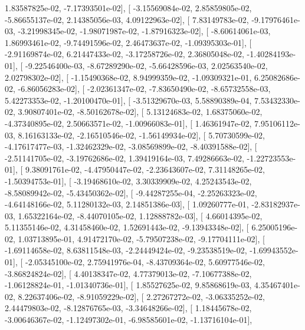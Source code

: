 \documentclass{article}
\begin{document}
          1.83587825e-02,  -7.17393501e-02],
       [ -3.15569084e-02,   2.85859805e-02,  -5.86655137e-02,
          2.14385056e-03,   4.09122963e-02],
       [  7.83149783e-02,  -9.17976461e-03,  -3.21998345e-02,
         -1.98071987e-02,  -1.87916323e-02],
       [ -8.60614061e-03,   1.86993461e-02,  -9.74491596e-02,
          2.46473637e-02,  -1.09395303e-01],
       [ -2.91169874e-02,   6.21447433e-02,  -3.17258726e-02,
          2.36805048e-02,  -1.40284193e-01],
       [ -9.22546400e-03,  -8.67289290e-02,  -5.66428596e-03,
          2.02563540e-02,   2.02798302e-02],
       [ -1.15490368e-02,   8.94999359e-02,  -1.09309321e-01,
          6.25082686e-02,  -6.86056283e-02],
       [ -2.02361347e-02,  -7.83650490e-02,  -8.65732558e-03,
          5.42273353e-02,  -1.20100470e-01],
       [ -3.51329670e-03,   5.58890389e-04,   7.53432330e-02,
          3.90807401e-02,  -8.50162678e-02],
       [  5.13124683e-02,   1.68375060e-02,  -4.37340895e-02,
          2.50663571e-02,  -1.00966083e-01],
       [  1.46361947e-02,   7.95106112e-03,   8.16163133e-02,
         -2.16510546e-02,  -1.56149934e-02],
       [  5.70730599e-02,  -4.17617477e-03,  -1.32462329e-02,
         -3.08569899e-02,  -8.40391588e-02],
       [ -2.51141705e-02,  -3.19762686e-02,   1.39419164e-03,
          7.49286663e-02,  -1.22723553e-01],
       [  9.38091761e-02,  -4.47950447e-02,  -2.23643607e-02,
          7.31148265e-02,  -1.50394753e-01],
       [ -3.19468610e-02,   3.30339909e-02,   4.25243543e-02,
         -8.58089942e-02,  -5.43450362e-02],
       [ -9.44287255e-04,  -2.25263323e-02,  -4.64148166e-02,
          5.11280132e-03,   2.14851386e-03],
       [  1.09260777e-01,  -2.83182937e-03,   1.65322164e-02,
         -8.44070105e-02,   1.12888782e-03],
       [  4.66014395e-02,   5.11355146e-02,   4.31458460e-02,
          1.52691443e-02,  -9.13943348e-02],
       [  6.25005196e-02,   1.03713895e-01,   4.91472170e-02,
         -5.79507238e-02,  -9.17704111e-02],
       [ -1.69114658e-02,   8.63811548e-03,  -2.24449424e-02,
         -9.23538519e-02,  -1.69943552e-01],
       [ -2.05345100e-02,   2.75941976e-04,  -8.43709364e-02,
          5.60977546e-02,  -3.86824824e-02],
       [  4.40138347e-02,   4.77379013e-02,  -7.10677388e-02,
         -1.06128824e-01,  -1.01340736e-01],
       [  1.85527625e-02,   9.85868619e-03,   4.35467401e-02,
          8.22637406e-02,  -8.91059229e-02],
       [  2.27267272e-02,  -3.06335252e-02,   2.44479803e-02,
         -8.12876765e-03,  -3.34648266e-02],
       [  1.18445678e-02,  -3.00646367e-02,  -1.12497302e-01,
         -6.98585601e-02,  -1.13716104e-01],
\end{document}
